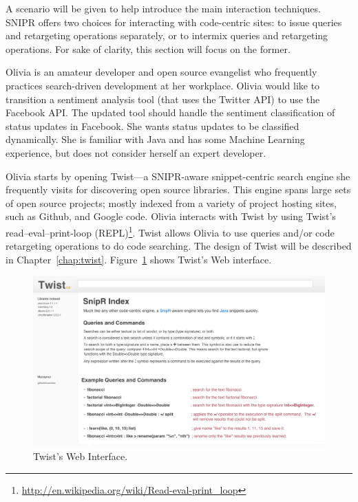 A scenario will be given to help introduce the main interaction techniques. \uppercase{SnipR} offers two choices for interacting with code-centric sites: to issue queries and retargeting operations separately, or to intermix queries and retargeting operations. For sake of clarity, this section will focus on the former.

Olivia is an amateur developer and open source evangelist who frequently practices search-driven development at her workplace. Olivia would like to transition a sentiment analysis tool (that uses the Twitter API) to use the Facebook API. The updated tool should handle the sentiment classification of status updates in Facebook. She wants status updates to be classified dynamically. She is familiar with Java and has some Machine Learning experience, but does not consider herself an expert developer.

Olivia starts by opening Twist---a \uppercase{SnipR}-aware snippet-centric search engine she frequently visits for discovering open source libraries. This engine spans large sets of open source projects; mostly indexed from a variety of project hosting sites, such as Github, and Google code. Olivia interacts with Twist by using Twist's read–eval–print-loop (REPL)\footnote{\url{http://en.wikipedia.org/wiki/Read-eval-print_loop}}. Twist allows Olivia to use queries and/or code retargeting operations to do code searching. The design of Twist will be described in Chapter~\ref{chap:twist}. Figure~\ref{fig:twist} shows Twist's Web interface. 

\begin{figure}[!ht]
    \centering
    \includegraphics[width=\textwidth]{images/twistsite}
    \caption{Twist's Web Interface.}
    \label{fig:twist}
\end{figure}

